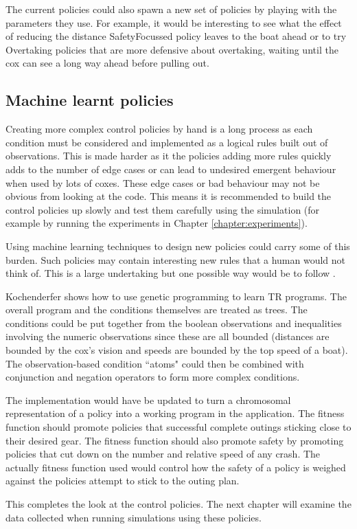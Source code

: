 The current policies could also spawn a new set of policies by playing with the parameters they use. For example, it would be interesting to see what the effect of reducing the distance SafetyFocussed policy leaves to the boat ahead or to try Overtaking policies that are more defensive about overtaking, waiting until the cox can see a long way ahead before pulling out.

\subsection{Machine learnt policies}\label{control:future:machinelearnt}
Creating more complex control policies by hand is a long process as each condition must be considered and implemented as a logical rules built out of observations. This is made harder as it the policies adding more rules quickly adds to the number of edge cases or can lead to undesired emergent behaviour when used by lots of coxes. These edge cases or bad behaviour may not be obvious from looking at the code. This means it is recommended to build the control policies up slowly and test them carefully using the simulation (for example by running the experiments in Chapter \ref{chapter:experiments}).

Using machine learning techniques to design new policies could carry some of this burden. Such policies may contain interesting new rules that a human would not think of. This is a large undertaking but one possible way would be to follow \textcite{Kochenderfer2003}. 

Kochenderfer shows how to use genetic programming to learn TR programs. The overall program and the conditions themselves are treated as trees. The conditions could be put together from the boolean observations and inequalities involving the numeric observations since these are all bounded (distances are bounded by the cox's vision and speeds are bounded by the top speed of a boat). The observation-based condition ``atoms" could then be combined with conjunction and negation operators to form more complex conditions.

The implementation would have be updated to turn a chromosomal representation of a policy into a working program in the application. The fitness function should promote policies that successful complete outings sticking close to their desired gear. The fitness function should also promote safety by promoting policies that cut down on the number and relative speed of any crash. The actually fitness function used would control how the safety of a policy is weighed against the policies attempt to stick to the outing plan.

This completes the look at the control policies. The next chapter will examine the data collected when running simulations using these policies.